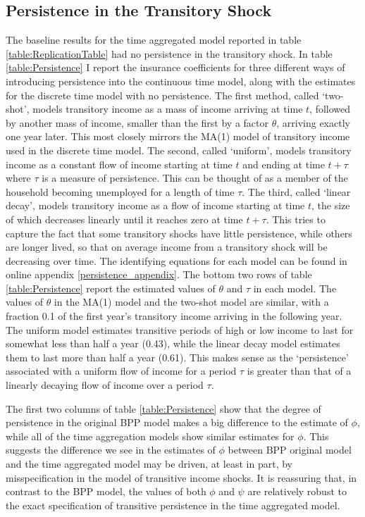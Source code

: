\documentclass[AER]{AEA}
\begin{document}
\subsection{Persistence in the Transitory Shock} \label{persistence}
The baseline results for the time aggregated model reported in table \ref{table:ReplicationTable} had no persistence in the transitory shock. In table \ref{table:Persistence} I report the insurance coefficients for three different ways of introducing persistence into the continuous time model, along with the estimates for the discrete time model with no persistence. The first method, called `two-shot', models transitory income as a mass of income arriving at time $t$, followed by another mass of income, smaller than the first by a factor $\theta$, arriving exactly one year later. This most closely mirrors the MA(1) model of transitory income used in the discrete time model. The second, called `uniform', models transitory income as a constant flow of income starting at time $t$ and ending at time $t+\tau$ where $\tau$ is a measure of persistence. This can be thought of as a member of the household becoming unemployed for a length of time $\tau$. The third, called `linear decay', models transitory income as a flow of income starting at time $t$, the size of which decreases linearly until it reaches zero at time $t+\tau$. This tries to capture the fact that some transitory shocks have little persistence, while others are longer lived, so that on average income from a transitory shock will be decreasing over time. The identifying equations for each model can be found in online appendix \ref{persistence_appendix}. The bottom two rows of table \ref{table:Persistence} report the estimated values of $\theta$ and $\tau$ in each model. The values of $\theta$ in the MA(1) model and the two-shot model are similar, with a fraction 0.1 of the first year's transitory income arriving in the following year. The uniform model estimates transitive periods of high or low income to last for somewhat less than half a year (0.43), while the linear decay model estimates them to last more than half a year (0.61). This makes sense as the `persistence' associated with a uniform flow of income for a period $\tau$ is greater than that of a linearly decaying flow of income over a period $\tau$.

The first two columns of table \ref{table:Persistence} show that the degree of persistence in the original BPP model makes a big difference to the estimate of $\phi$, while all of the time aggregation models show similar estimates for $\phi$. This suggests the difference we see in the estimates of $\phi$ between BPP original model and the time aggregated model may be driven, at least in part, by misspecification in the model of transitive income shocks. It is reassuring that, in contrast to the BPP model, the values of both $\phi$ and $\psi$ are relatively robust to the exact specification of transitive persistence in the time aggregated model.
\end{document}
